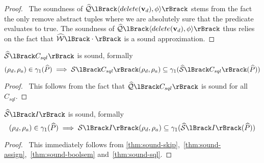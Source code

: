 \begin{proof}
    \pfsketch\
    The soundness of $\abssqlsem{\langle delete(\absattrs), \abspred \rangle}$ stems from the fact the only remove abstract tuples where we are absolutely sure that the predicate evaluates to true.
    The soundness of $\abssqlsem{\langle delete(\absattrs), \abspred \rangle}$ thus relies on the fact that $\abspredsem{\cdot}$ is a sound approximation.
\end{proof}


\begin{conjecture}
    \label{thm:sound-sql}
    $\abssem{C_{sql}}$ is sound, formally
    \begin{equation*}
    (\rho_d, \rho_a)
        \in \concrete_1(\ab{P}) \implies \sem{C_{sql}}(\rho_d, \rho_a) \subseteq \concrete_1(\abssem{C_{sql}}(\ab{P}))
    \end{equation*}
\end{conjecture}


\begin{proof}
    \pf\
    This follows from the fact that $\abssqlsem{C_{sql}}$ is sound for all $C_{sql}$.
\end{proof}


\begin{conjecture}
    $\abssem{I}$ is sound, formally
    \begin{equation*}
        (\rho_d, \rho_a)
            \in \concrete_1(\ab{P}) \implies \sem{I}(\rho_d, \rho_a) \subseteq \concrete_1(\abssem{I}(\ab{P}))
    \end{equation*}
\end{conjecture}


\begin{proof}
    \pf\
    This immediately follows from \autoref{thm:sound-skip},~\ref{thm:sound-assign},~\ref{thm:sound-boolsem} and~\ref{thm:sound-sql}.
\end{proof}
